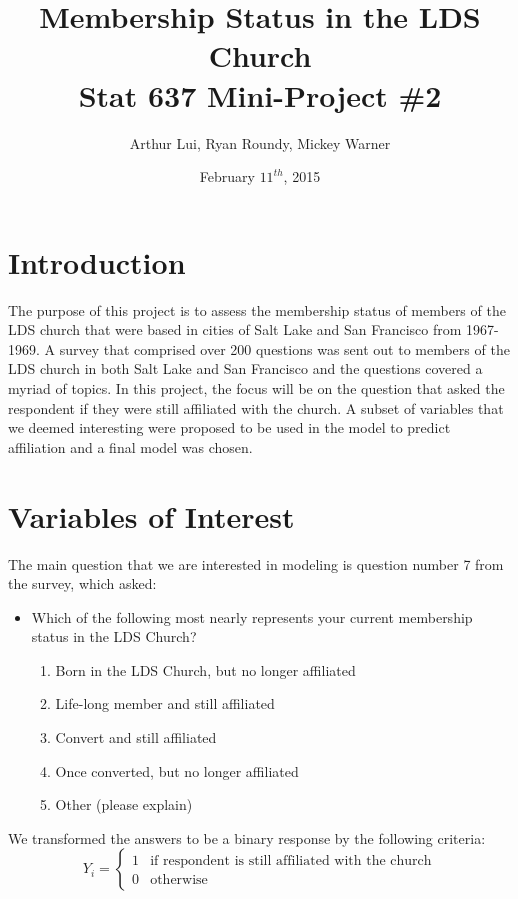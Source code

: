 \documentclass[11pt]{article}
\title{Membership Status in the LDS Church \\ \vspace{1mm} \large Stat 637 Mini-Project \#2}
\date{February $11^{th}$, 2015}
\author{Arthur Lui, Ryan Roundy, Mickey Warner}
\begin{document}
\maketitle

\section*{Introduction}
The purpose of this project is to assess the membership status of members of the LDS church that were based in cities of Salt Lake and San Francisco from 1967-1969. A survey that comprised over 200 questions was sent out to members of the LDS church in both Salt Lake and San Francisco and the questions covered a myriad of topics. In this project, the focus will be on the question that asked the respondent if they were still affiliated with the church. A subset of variables that we deemed interesting were proposed to be used in the model to predict affiliation and a final model was chosen.

\section*{Variables of Interest}
The main question that we are interested in modeling is question number 7 from the survey, which asked:
\begin{itemize}
\item{Which of the following most nearly represents your current membership status in the LDS Church?}
\begin{enumerate}
\item{Born in the LDS Church, but no longer affiliated}
\item{Life-long member and still affiliated}
\item{Convert and still affiliated}
\item{Once converted, but no longer affiliated}
\item{Other (please explain)}
\end{enumerate}
\end{itemize}
We transformed the answers to be a binary response by the following criteria:
\begin{equation*}
Y_{i}=\left\{
     \begin{array}{lr}
     1 & \text{if respondent is still affiliated with the church}  \\
     0 & \text{otherwise}
     \end{array}
\right.
\end{equation*}
\end{document}

